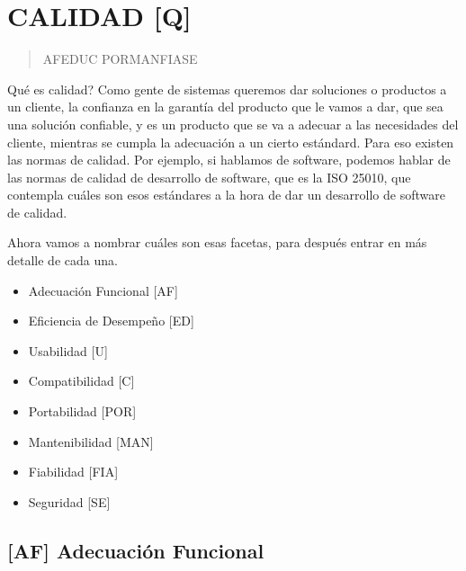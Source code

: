 
\twocolumn
\hypertarget{calidad-q}{%
\section{CALIDAD [Q]}\label{calidad-q}}


\begin{quote}
AFEDUC PORMANFIASE
\end{quote}

Qué es calidad? Como gente de sistemas queremos dar soluciones o
productos a un cliente, la confianza en la garantía del producto que le
vamos a dar, que sea una solución confiable, y es un producto que se va
a adecuar a las necesidades del cliente, mientras se cumpla la
adecuación a un cierto estándard. Para eso existen las normas de
calidad. Por ejemplo, si hablamos de software, podemos hablar de las
normas de calidad de desarrollo de software, que es la ISO 25010, que
contempla cuáles son esos estándares a la hora de dar un desarrollo de
software de calidad.

Ahora vamos a nombrar cuáles son esas facetas, para después entrar en
más detalle de cada una.

\begin{itemize}
  \setlength\itemsep{-1em}
\item
  Adecuación Funcional {[}AF{]}
\item
  Eficiencia de Desempeño {[}ED{]}
\item
  Usabilidad {[}U{]}
\item
  Compatibilidad {[}C{]}
\item
  Portabilidad {[}POR{]}
\item
  Mantenibilidad {[}MAN{]}
\item
  Fiabilidad {[}FIA{]}
\item
  Seguridad {[}SE{]}
\end{itemize}


\hypertarget{adecuaciuxf3n-funcional-af}{%
\subsection{%
{[}AF{]}
Adecuación Funcional
}\label{adecuaciuxf3n-funcional-af}}

